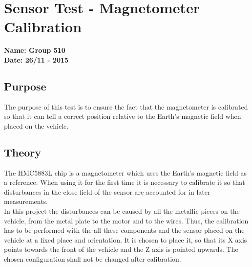 \pagebreak
\section{Sensor Test - Magnetometer Calibration} \label{app:magnetoCalibration}
\textbf{Name: Group 510}\\
\textbf{Date: 26/11 - 2015}

\subsection{Purpose}
The purpose of this test is to ensure the fact that the magnetometer is calibrated so that it can tell a correct position relative to the Earth's magnetic field when placed on the vehicle.

\subsection{Theory}
The HMC5883L chip \cite{HMC5883L} is a magnetometer which uses the Earth's magnetic field as a reference. When using it for the first time it is necessary to calibrate it so that disturbances in the close field of the sensor are accounted for in later measurements.\\
%
In this project the disturbances can be caused by all the metallic pieces on the vehicle, from the metal plate to the motor and to the wires. Thus, the calibration has to be performed with the all these components and the sensor placed on the vehicle at a fixed place and orientation. It is chosen to place it, so that its X axis points towards the front of the vehicle and the Z axis is pointed upwards. The chosen configuration shall not be changed after calibration.

